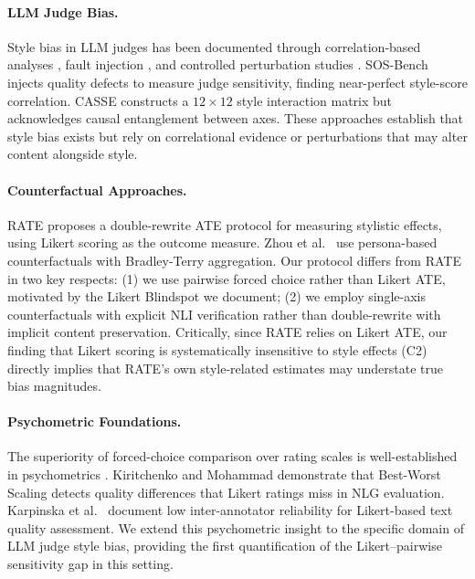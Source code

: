 \documentclass[11pt,a4paper]{article}
\begin{document}
\paragraph{LLM Judge Bias.}
Style bias in LLM judges has been documented through correlation-based analyses \cite{sosbench2025,casse2026,soumik2026}, fault injection \cite{sosbench2025}, and controlled perturbation studies \cite{stureborg2024,fairjudge2025}.
SOS-Bench injects quality defects to measure judge sensitivity, finding near-perfect style-score correlation.
CASSE constructs a $12{\times}12$ style interaction matrix but acknowledges causal entanglement between axes.
These approaches establish that style bias exists but rely on correlational evidence or perturbations that may alter content alongside style.

\paragraph{Counterfactual Approaches.}
RATE \cite{rate2025} proposes a double-rewrite ATE protocol for measuring stylistic effects, using Likert scoring as the outcome measure.
Zhou et al.\ \cite{zhou2025counterfactual} use persona-based counterfactuals with Bradley-Terry aggregation.
Our protocol differs from RATE in two key respects: (1) we use pairwise forced choice rather than Likert ATE, motivated by the Likert Blindspot we document; (2) we employ single-axis counterfactuals with explicit NLI verification rather than double-rewrite with implicit content preservation.
Critically, since RATE relies on Likert ATE, our finding that Likert scoring is systematically insensitive to style effects (C2) directly implies that RATE's own style-related estimates may understate true bias magnitudes.

\paragraph{Psychometric Foundations.}
The superiority of forced-choice comparison over rating scales is well-established in psychometrics \cite{thurstone1927,kiritchenko2017,novikova2018}.
Kiritchenko and Mohammad demonstrate that Best-Worst Scaling detects quality differences that Likert ratings miss in NLG evaluation.
Karpinska et al.\ \cite{karpinska2021} document low inter-annotator reliability for Likert-based text quality assessment.
We extend this psychometric insight to the specific domain of LLM judge style bias, providing the first quantification of the Likert--pairwise sensitivity gap in this setting.
\end{document}
